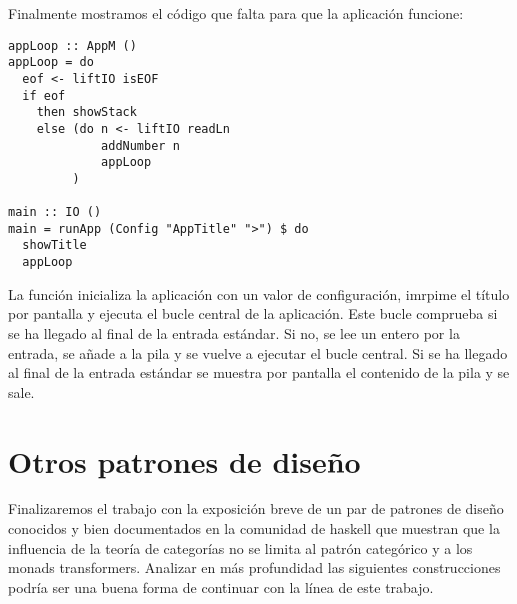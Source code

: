 Finalmente mostramos el código que falta para que la aplicación
funcione:
\begin{verbatim}
appLoop :: AppM ()
appLoop = do
  eof <- liftIO isEOF
  if eof
    then showStack
    else (do n <- liftIO readLn
             addNumber n
             appLoop
         )

main :: IO ()
main = runApp (Config "AppTitle" ">") $ do
  showTitle
  appLoop
\end{verbatim}
La función  inicializa la aplicación con un valor
de configuración, imrpime el título por pantalla y ejecuta el
bucle central de la aplicación. Este bucle comprueba si se
ha llegado al final de la entrada estándar. Si no, se lee un entero
por la entrada, se añade a la pila y se vuelve a ejecutar el bucle
central. Si se ha llegado al final de la entrada estándar se
muestra por pantalla el contenido de la pila y se sale.

\section{Otros patrones de diseño}
Finalizaremos el trabajo con la exposición breve de un par de
patrones de diseño conocidos y bien documentados en la comunidad
de haskell que muestran que la influencia de la teoría de categorías
no se limita al patrón categórico y a los monads transformers.
Analizar en más profundidad las siguientes construcciones podría
ser una buena forma de continuar con la línea de este trabajo.

